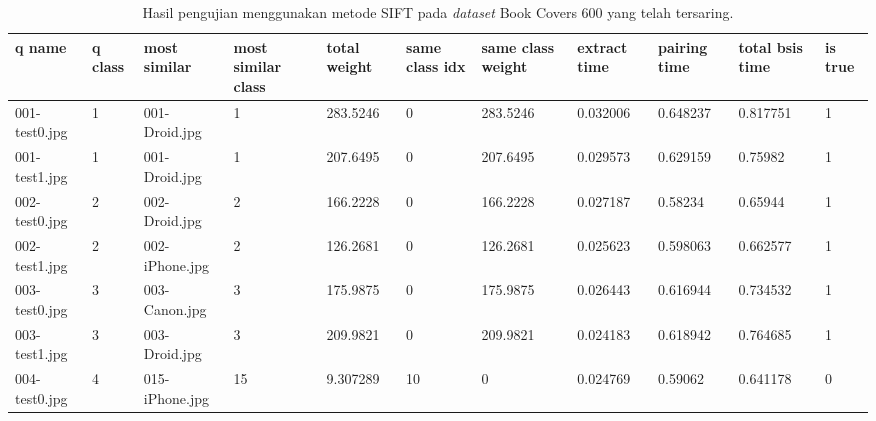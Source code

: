 \begin{landscape}
	\begin{longtable}{|p{2cm}|p{1cm}|p{2cm}|p{1cm}|p{2cm}|p{1cm}|p{2cm}|p{2cm}|p{2cm}|p{2cm}|p{1cm}|}
		\caption{Hasil pengujian menggunakan metode SIFT pada \textit{dataset} Book Covers 600 yang telah tersaring.} \\
		\hline
		\textbf{q name} & \textbf{q class} & \textbf{most similar} & \textbf{most similar class} & \textbf{total weight} & \textbf{same class idx} & \textbf{same class weight} & \textbf{extract time} & \textbf{pairing time} & \textbf{total bsis time} & \textbf{is true} \\ \hline
		001-test0.jpg   & 1                & 001-Droid.jpg         & 1                           & 283.5246              & 0                       & 283.5246                   & 0.032006              & 0.648237              & 0.817751                 & 1                \\ \hline
		001-test1.jpg   & 1                & 001-Droid.jpg         & 1                           & 207.6495              & 0                       & 207.6495                   & 0.029573              & 0.629159              & 0.75982                  & 1                \\ \hline
		002-test0.jpg   & 2                & 002-Droid.jpg         & 2                           & 166.2228              & 0                       & 166.2228                   & 0.027187              & 0.58234               & 0.65944                  & 1                \\ \hline
		002-test1.jpg   & 2                & 002-iPhone.jpg        & 2                           & 126.2681              & 0                       & 126.2681                   & 0.025623              & 0.598063              & 0.662577                 & 1                \\ \hline
		003-test0.jpg   & 3                & 003-Canon.jpg         & 3                           & 175.9875              & 0                       & 175.9875                   & 0.026443              & 0.616944              & 0.734532                 & 1                \\ \hline
		003-test1.jpg   & 3                & 003-Droid.jpg         & 3                           & 209.9821              & 0                       & 209.9821                   & 0.024183              & 0.618942              & 0.764685                 & 1                \\ \hline
		004-test0.jpg   & 4                & 015-iPhone.jpg        & 15                          & 9.307289              & 10                      & 0                          & 0.024769              & 0.59062               & 0.641178                 & 0                \\ \hline

\end{longtable}
\end{landscape}
